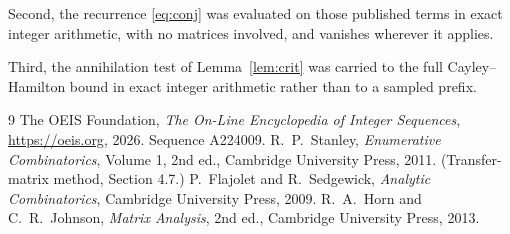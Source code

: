 \documentclass[11pt,a4paper]{article}
\theoremstyle{plain}
\theoremstyle{definition}
\begin{document}
Second, the recurrence \eqref{eq:conj} was evaluated on those published terms in exact
integer arithmetic, with no matrices involved, and vanishes wherever it applies.

Third, the annihilation test of Lemma~\ref{lem:crit} was carried to the full
Cayley--Hamilton bound in exact integer arithmetic rather than to a sampled prefix.

\begin{thebibliography}{9}
 The OEIS Foundation, \emph{The On-Line Encyclopedia of Integer
Sequences}, \url{https://oeis.org}, 2026. Sequence A224009.
 R.~P.~Stanley, \emph{Enumerative Combinatorics}, Volume 1, 2nd ed.,
Cambridge University Press, 2011. (Transfer-matrix method, Section 4.7.)
 P.~Flajolet and R.~Sedgewick, \emph{Analytic Combinatorics}, Cambridge
University Press, 2009.
 R.~A.~Horn and C.~R.~Johnson, \emph{Matrix Analysis}, 2nd ed., Cambridge
University Press, 2013.
\end{thebibliography}
\end{document}
